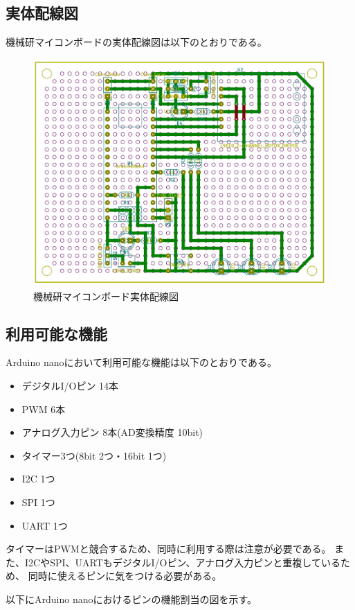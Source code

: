 \documentclass[uplatex]{jsarticle}
\begin{document}
\subsection{実体配線図}
機械研マイコンボードの実体配線図は以下のとおりである。
\begin{figure}
    \centering
    \includegraphics[width=15cm]{wiring.png}
    \caption{機械研マイコンボード実体配線図}
\end{figure}
\subsection{利用可能な機能}
Arduino nanoにおいて利用可能な機能は以下のとおりである。
\begin{itemize}
    \item デジタルI/Oピン 14本
    \item PWM 6本
    \item アナログ入力ピン 8本(AD変換精度 10bit)
    \item タイマー3つ(8bit 2つ・16bit 1つ)
    \item I2C 1つ
    \item SPI 1つ
    \item UART 1つ
\end{itemize}
タイマーはPWMと競合するため、同時に利用する際は注意が必要である。
また、I2CやSPI、UARTもデジタルI/Oピン、アナログ入力ピンと重複しているため、
同時に使えるピンに気をつける必要がある。

以下にArduino nanoにおけるピンの機能割当の図を示す。
\end{document}
